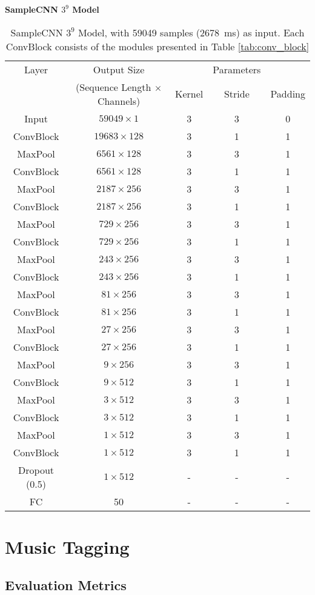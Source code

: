 \begin{table}[h]
    \centering
    \textbf{SampleCNN $3^9$ Model} \\
    \begin{tabular}{ccccc}
        \toprule Layer & Output Size & & Parameters & \\
        & (Sequence Length $\times$ Channels) & Kernel & Stride & Padding \\\hline
        Input & $59049 \times 1$ & 3 & 3 & 0 \\\hline
        ConvBlock & $19683 \times 128$ & 3 & 1 & 1 \\
        MaxPool & $6561 \times 128$ & 3 & 3 & 1 \\\hline
        ConvBlock & $6561 \times 128$ & 3 & 1 & 1 \\
        MaxPool & $2187 \times 256$ & 3 & 3 & 1 \\\hline
        ConvBlock & $2187 \times 256$ & 3 & 1 & 1 \\
        MaxPool & $729 \times 256$ & 3 & 3 & 1 \\\hline
        ConvBlock & $729 \times 256$ & 3 & 1 & 1 \\
        MaxPool & $243 \times 256$ & 3 & 3 & 1 \\\hline
        ConvBlock & $243 \times 256$ & 3 & 1 & 1 \\
        MaxPool & $81 \times 256$ & 3 & 3 & 1 \\\hline
        ConvBlock & $81 \times 256$ & 3 & 1 & 1 \\
        MaxPool & $27 \times 256$ & 3 & 3 & 1 \\\hline
        ConvBlock & $27 \times 256$ & 3 & 1 & 1 \\
        MaxPool & $9 \times 256$ & 3 & 3 & 1 \\\hline
        ConvBlock & $9 \times 512$ & 3 & 1 & 1 \\
        MaxPool & $3 \times 512$ & 3 & 3 & 1 \\\hline
        ConvBlock & $3 \times 512$ & 3 & 1 & 1 \\
        MaxPool & $1 \times 512$ & 3 & 3 & 1 \\\hline
        ConvBlock & $1 \times 512$ & 3 & 1 & 1 \\
        Dropout (0.5) & $1 \times 512$ & - & - & - \\\hline
        FC & 50 & - & - & - \\
        \bottomrule
    \end{tabular}
    \caption{SampleCNN $3^9$ Model, with 59049 samples (2678~ms) as input. Each ConvBlock consists of the modules presented in Table \ref{tab:conv_block}}
    \label{tab:samplecnn_model}
\end{table}


\section{Music Tagging}

\subsection{Evaluation Metrics}
